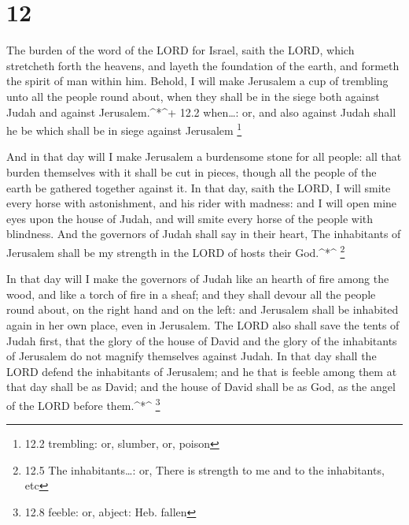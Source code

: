 \hypertarget{section-11}{%
\section{12}\label{section-11}}

 The burden of the word of the LORD for Israel, saith the
LORD, which stretcheth forth the heavens, and layeth the foundation of
the earth, and formeth the spirit of man within him. 
Behold, I will make Jerusalem a cup of trembling unto all the people
round about, when they shall be in the siege both against Judah and
against Jerusalem.\^{}*\^{}+ 12.2 when\ldots: or, and also against Judah
shall he be which shall be in siege against Jerusalem \footnote{12.2
  trembling: or, slumber, or, poison}

 And in that day will I make Jerusalem a burdensome stone
for all people: all that burden themselves with it shall be cut in
pieces, though all the people of the earth be gathered together against
it.  In that day, saith the LORD, I will smite every horse
with astonishment, and his rider with madness: and I will open mine eyes
upon the house of Judah, and will smite every horse of the people with
blindness.  And the governors of Judah shall say in their
heart, The inhabitants of Jerusalem shall be my strength in the LORD of
hosts their God.\^{}*\^{} \footnote{12.5 The inhabitants\ldots: or,
  There is strength to me and to the inhabitants, etc}

 In that day will I make the governors of Judah like an
hearth of fire among the wood, and like a torch of fire in a sheaf; and
they shall devour all the people round about, on the right hand and on
the left: and Jerusalem shall be inhabited again in her own place, even
in Jerusalem.  The LORD also shall save the tents of Judah
first, that the glory of the house of David and the glory of the
inhabitants of Jerusalem do not magnify themselves against Judah.
 In that day shall the LORD defend the inhabitants of
Jerusalem; and he that is feeble among them at that day shall be as
David; and the house of David shall be as God, as the angel of the LORD
before them.\^{}*\^{} \footnote{12.8 feeble: or, abject: Heb. fallen}

